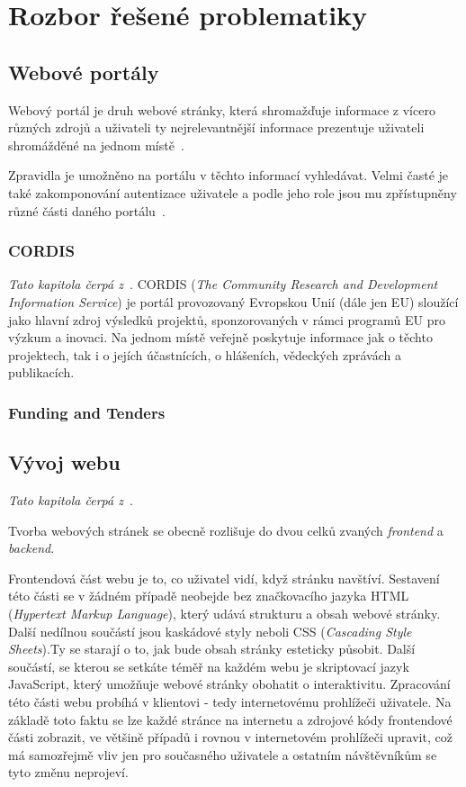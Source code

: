 \chapter{Rozbor řešené problematiky}

\section{Webové portály}
Webový portál je druh webové stránky, která shromažďuje informace z vícero různých zdrojů a uživateli ty nejrelevantnější informace prezentuje uživateli shromážděné na jednom místě~\cite{bib:portal-liferay}.

Zpravidla je umožněno na portálu v těchto informací vyhledávat. Velmi časté je také zakomponování autentizace uživatele a podle jeho role jsou mu zpřístupněny různé části daného portálu~\cite{bib:portal-indiana}. 

\blindtext[2]

\subsection{CORDIS}
\emph{Tato kapitola čerpá z~\cite{bib:cordis}}.
CORDIS (\emph{The Community Research and Development Information Service}) je portál provozovaný Evropskou Unií (dále jen EU) sloužící jako hlavní zdroj výsledků projektů, sponzorovaných v rámci programů EU pro výzkum a inovaci. Na jednom místě veřejně poskytuje informace jak o těchto projektech, tak i o jejích účastnících, o hlášeních, vědeckých zprávách a publikacích.
\blindtext

\subsection{Funding and Tenders}
\blindtext



\section{Vývoj webu}
\emph{Tato kapitola čerpá z~\cite{bib:web-development}}.

Tvorba webových stránek se obecně rozlišuje do dvou celků zvaných \emph{frontend} a \emph{backend}.

Frontendová část webu je to, co uživatel vidí, když stránku navštíví. Sestavení této části se v žádném případě neobejde bez značkovacího jazyka HTML (\emph{Hypertext Markup Language}), který udává strukturu a obsah webové stránky. Další nedílnou součástí jsou kaskádové styly neboli CSS (\emph{Cascading Style Sheets}).Ty se starají o to, jak bude obsah stránky esteticky působit. Další součástí, se kterou se setkáte téměř na každém webu je skriptovací jazyk JavaScript, který umožňuje webové stránky obohatit o interaktivitu.
Zpracování této části webu probíhá v klientovi - tedy internetovému prohlížeči uživatele. Na základě toto faktu se lze každé stránce na internetu  a zdrojové kódy frontendové části zobrazit, ve většině případů i rovnou v internetovém prohlížeči upravit, což má samozřejmě vliv jen pro současného uživatele a ostatním návštěvníkům se tyto změnu neprojeví.

